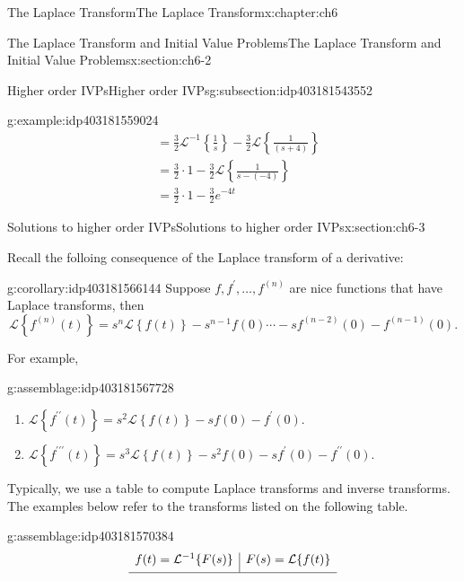 \documentclass[oneside,10pt,]{book}
\numberwithin{equation}{section}
\newcommand{\inv}{^{-1}}
\numberwithin{equation}{section}
\newcommand{\amp}{&}
\begin{document}
\begin{chapterptx}{The Laplace Transform}{}{The Laplace Transform}{}{}{x:chapter:ch6}
\begin{sectionptx}{The Laplace Transform and Initial Value Problems}{}{The Laplace Transform and Initial Value Problems}{}{}{x:section:ch6-2}
\begin{subsectionptx}{Higher order IVPs}{}{Higher order IVPs}{}{}{g:subsection:idp403181543552}
\begin{example}{}{g:example:idp403181559024}
\begin{align*}
\amp =\frac{3}{2}\mathcal{L}^{-1}\left\{ \frac{1}{s}\right\} -\frac{3}{2}\mathcal{L}\left\{ \frac{1}{\left(s+4\right)}\right\} \\
\amp =\frac{3}{2}\cdot1-\frac{3}{2}\mathcal{L}\left\{ \frac{1}{s-(-4)}\right\} \\
\amp =\frac{3}{2}\cdot1-\frac{3}{2}e^{-4t}
\end{align*}
%
\end{example}
\end{subsectionptx}
\end{sectionptx}
%
%
\typeout{************************************************}
\typeout{************************************************}
%
\begin{sectionptx}{Solutions to higher order IVPs}{}{Solutions to higher order IVPs}{}{}{x:section:ch6-3}
\begin{introduction}{}%
Recall the folloing consequence of the Laplace transform of a derivative:%
\begin{corollary}{}{}{g:corollary:idp403181566144}%
Suppose \(f,f^{\prime},\dots,f^{(n)}\) are nice functions that have Laplace transforms, then%
\begin{equation*}
\mathcal{L}\left\{ f^{(n)}(t)\right\} =s^{n}\mathcal{L}\left\{ f(t)\right\} -s^{n-1}f(0)\cdots-sf^{(n-2)}(0)-f^{(n-1)}(0).
\end{equation*}
%
\end{corollary}
 For example, \begin{assemblage}{}{g:assemblage:idp403181567728}%
%
\begin{enumerate}
\item{}\(\mathcal{L}\left\{ f^{\prime\prime}(t)\right\} =s^{2}\mathcal{L}\left\{ f(t)\right\} -sf(0)-f^{\prime}(0)\).%
\item{}\(\mathcal{L}\left\{ f^{\prime\prime\prime}(t)\right\} =s^{3}\mathcal{L}\left\{ f(t)\right\} -s^{2}f(0)-sf^{\prime}(0)-f^{\prime\prime}(0)\).%
\end{enumerate}
%
\end{assemblage}
Typically, we use a table to compute Laplace transforms and inverse transforms. The examples below refer to the transforms listed on the following table.%
\begin{assemblage}{}{g:assemblage:idp403181570384}%
%
\begin{equation*}
\begin{array}{l|l}
f(t) = \mathcal{L}\inv\{F(s)\} \amp F(s) = \mathcal{L}\{f(t)\} \\[4pt] \hline

\end{array}
\end{equation*}
\end{assemblage}
\end{introduction}
\end{sectionptx}
\end{chapterptx}
\end{document}
